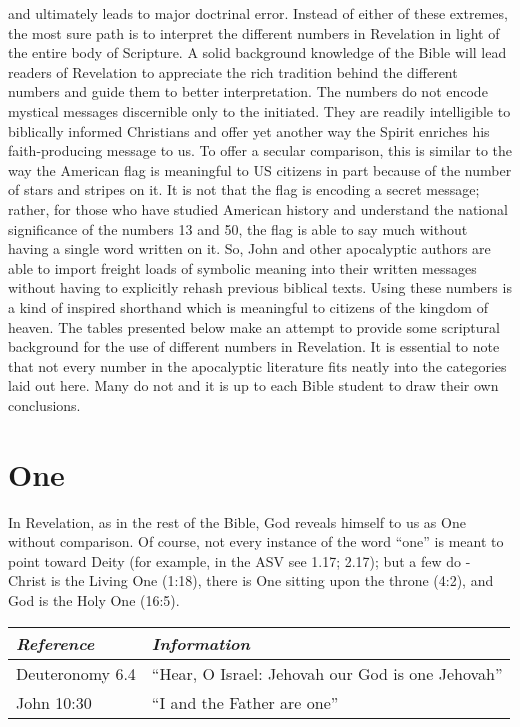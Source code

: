 and ultimately leads to major doctrinal error.
\newline\newline
Instead of either of these extremes, the most sure path is to interpret the different numbers in Revelation in light of the entire body of Scripture. A solid background knowledge of the Bible will lead readers of Revelation to appreciate the rich tradition behind the different numbers and guide them to better interpretation. The numbers do not encode mystical messages discernible only to the initiated. They are readily intelligible to biblically informed Christians and offer yet another way the Spirit enriches his faith-producing message to us. 
\newline\newline
To offer a secular comparison, this is similar to the way the American flag is meaningful to US citizens in part because of the number of stars and stripes on it. It is not that the flag is encoding a secret message; rather, for those who have studied American history and understand the national significance of the numbers 13 and 50, the flag is able to say much without having a single word written on it. So, John and other apocalyptic authors are able to import freight loads of symbolic meaning into their written messages without having to explicitly rehash previous biblical texts. Using these numbers is a kind of inspired shorthand which is meaningful to citizens of the kingdom of heaven.
\newline\newline
The tables presented below make an attempt to provide some scriptural background for the use of different numbers in Revelation. It is essential to note that not every number in the apocalyptic literature fits neatly into the categories laid out here. Many do not and it is up to each Bible student to draw their own conclusions.

\section*{One}

In Revelation, as in the rest of the Bible, God reveals himself to us as One without comparison. Of course, not every instance of the word ``one'' is meant to point toward Deity (for example, in the ASV see 1.17; 2.17); but a few do - Christ is the Living One (1:18), there is One sitting upon the throne (4:2), and God is the Holy One (16:5).
\newline\newline
{}
\begin{tabularx}{\textwidth}{l X}
\toprule
\rowcolor{headergray}\emph{Reference} & \emph{Information}\\ 
\midrule
Deuteronomy 6.4 & ``Hear, O Israel: Jehovah our God is one Jehovah'' \\
\addlinespace
John 10:30 & ``I and the Father are one'' \\
\bottomrule
\end{tabularx}
	
